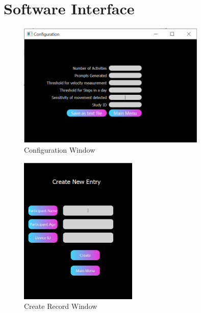 \documentclass[12pt, titlepage]{article}
\begin{document}
\appendix

\section{Software Interface}
\label{Software_UI}
\begin{figure}[H]
	\begin{center}
		 \includegraphics[width=0.8\textwidth]{Config}
		\caption{Configuration Window}
		\label{Config} 
	\end{center}
\end{figure}

\begin{figure}[H]
	\begin{center}
		 \includegraphics[width=0.5\textwidth]{CreateRecord}
		\caption{Create Record Window}
		\label{CreateRecord} 
	\end{center}
\end{figure}
\end{document}
